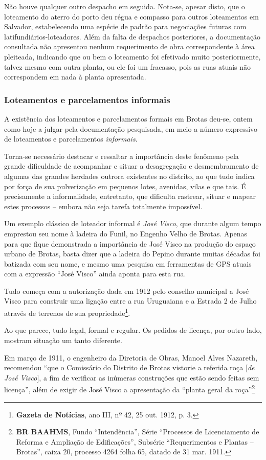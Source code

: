 Não houve qualquer outro despacho em seguida. Nota-se, apesar disto, que o loteamento do aterro do porto deu régua e compasso para outros loteamentos em Salvador, estabelecendo uma espécie de padrão para negociações futuras com latifundiários-loteadores. Além da falta de despachos posteriores, a documentação consultada não apresentou nenhum requerimento de obra correspondente à área pleiteada, indicando que ou bem o loteamento foi efetivado muito posteriormente, talvez mesmo com outra planta, ou ele foi um fracasso, pois as ruas atuais não correspondem em nada à planta apresentada.

\subsubsection{Loteamentos e parcelamentos informais}

A existência dos loteamentos e parcelamentos formais em Brotas deu-se, ontem como hoje a julgar pela documentação pesquisada, em meio a número expressivo de loteamentos e parcelamentos \textit{informais}. 

Torna-se necessário destacar e ressaltar a importância deste fenômeno pela grande dificuldade de acompanhar e situar a desagregação e desmembramento de algumas das grandes herdades outrora existentes no distrito, ao que tudo indica por força de sua pulverização em pequenos lotes, avenidas, vilas e que tais. É precisamente a informalidade, entretanto, que dificulta rastrear, situar e mapear estes processos – embora não seja tarefa totalmente impossível.

Um exemplo clássico de loteador informal é \textit{José Visco}, que durante algum tempo emprestou seu nome à ladeira do Funil, no Engenho Velho de Brotas. Apenas para que fique demonstrada a importância de José Visco na produção do espaço urbano de Brotas, basta dizer que a ladeira do Pepino durante muitas décadas foi batizada com seu nome, e mesmo uma pesquisa em ferramentas de GPS atuais com a expressão ``José Visco'' ainda aponta para esta rua.

Tudo começa com a autorização dada em 1912 pelo conselho municipal a José Visco para construir uma ligação entre a rua Uruguaiana e a Estrada 2 de Julho através de terrenos de sua propriedade\footnote{\textbf{Gazeta de Notícias}, ano III, nº 42, 25 out. 1912, p. 3.}.

Ao que parece, tudo legal, formal e regular. Os pedidos de licença, por outro lado, mostram situação um tanto diferente.

Em março de 1911, o engenheiro da Diretoria de Obras, Manoel Alves Nazareth, recomendou ``que o Comissário do Distrito de Brotas vistorie a referida roça [\textit{de José Visco}], a fim de verificar as inúmeras construções que estão sendo feitas sem licença'', além de exigir de José Visco a apresentação da ``planta geral da roça''\footnote{\textbf{BR BAAHMS}, Fundo ``Intendência'', Série ``Processos de Licenciamento de Reforma e Ampliação de Edificações'', Subsérie ``Requerimentos e Plantas – Brotas'', caixa 20, processo 4264 folha 65, datado de 31 mar. 1911.}

